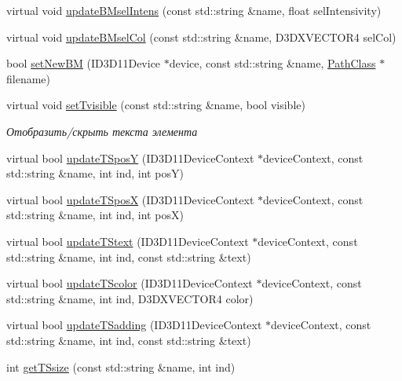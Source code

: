 \begin{DoxyCompactItemize}
virtual void \hyperlink{class_interface_element_class_a3855f9b8395a0d7571ebf86a55596ffa}{update\+B\+Msel\+Intens} (const std\+::string \&name, float sel\+Intensivity)
\item 
virtual void \hyperlink{class_interface_element_class_acd05ce4f703284b47bbfe6abb7a5026c}{update\+B\+Msel\+Col} (const std\+::string \&name, D3\+D\+X\+V\+E\+C\+T\+O\+R4 sel\+Col)
\item 
bool \hyperlink{class_interface_element_class_a91cdf8dd0c4ca5ec1a51588572ac07d4}{set\+New\+BM} (I\+D3\+D11\+Device $\ast$device, const std\+::string \&name, \hyperlink{class_path_class}{Path\+Class} $\ast$filename)
\item 
virtual void \hyperlink{class_interface_element_class_afbfd6e575119dee8d3bbca739354754e}{set\+Tvisible} (const std\+::string \&name, bool visible)
\begin{DoxyCompactList}\small\item\em Отобразить/скрыть текста элемента \end{DoxyCompactList}\item 
virtual bool \hyperlink{class_interface_element_class_afa2b0141aaaad7223ef087627aaa8570}{update\+T\+SposY} (I\+D3\+D11\+Device\+Context $\ast$device\+Context, const std\+::string \&name, int ind, int posY)
\item 
virtual bool \hyperlink{class_interface_element_class_a662b70e734c36fb0b792b7f9d8ab4eb1}{update\+T\+SposX} (I\+D3\+D11\+Device\+Context $\ast$device\+Context, const std\+::string \&name, int ind, int posX)
\item 
virtual bool \hyperlink{class_interface_element_class_a0cc96e120484d53c600515fefda32945}{update\+T\+Stext} (I\+D3\+D11\+Device\+Context $\ast$device\+Context, const std\+::string \&name, int ind, const std\+::string \&text)
\item 
virtual bool \hyperlink{class_interface_element_class_aceae624832991064f6b6e6f363911a5b}{update\+T\+Scolor} (I\+D3\+D11\+Device\+Context $\ast$device\+Context, const std\+::string \&name, int ind, D3\+D\+X\+V\+E\+C\+T\+O\+R4 color)
\item 
virtual bool \hyperlink{class_interface_element_class_ae505d58cae330457c8b5bbdd23bb644f}{update\+T\+Sadding} (I\+D3\+D11\+Device\+Context $\ast$device\+Context, const std\+::string \&name, int ind, const std\+::string \&text)
\item 
int \hyperlink{class_interface_element_class_ac7b96d7196906f80b377e293cc36404c}{get\+T\+Ssize} (const std\+::string \&name, int ind)
\item 

\end{DoxyCompactItemize}
